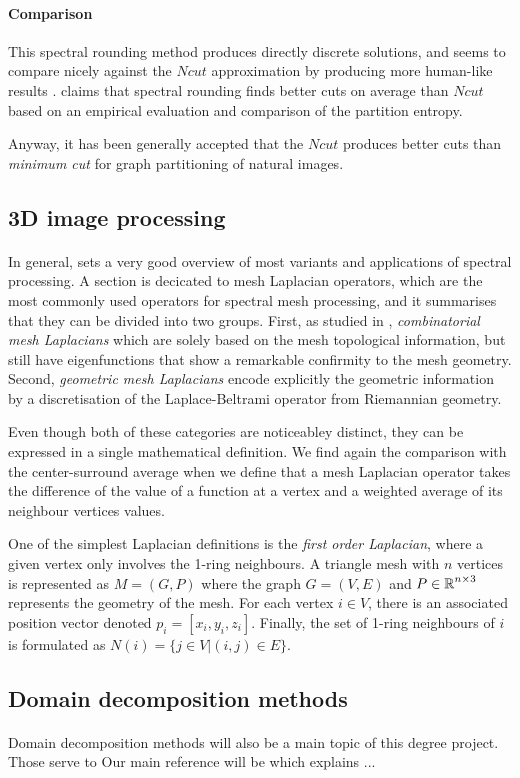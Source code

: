 \paragraph{Comparison}
This spectral rounding method produces directly discrete solutions, and seems to compare nicely against the \(Ncut\) approximation by producing more human-like results \cite{tolliver_spectral_2006}.
\cite{tolliver_graph_2006} claims that spectral rounding finds better cuts on average than \(Ncut\) based on an empirical evaluation and comparison of the partition entropy.

Anyway, it has been generally accepted that the \(Ncut\) produces better cuts than \textit{minimum cut} for graph partitioning of natural images.

\subsection{3D image processing}

\paragraph{}
In general, \cite{zhang_spectral_2010} sets a very good overview of most variants and applications of spectral processing.
A section is decicated to mesh Laplacian operators, which are the most commonly used operators for spectral mesh processing, and it summarises that they can be divided into two groups.
First, as studied in \cite{chung_spectral_1997}, \textit{combinatorial mesh Laplacians} which are solely based on the mesh topological information, but still have eigenfunctions that show a remarkable confirmity to the mesh geometry.
Second, \textit{geometric mesh Laplacians} encode explicitly the geometric information by a discretisation of the Laplace-Beltrami operator from Riemannian geometry.

Even though both of these categories are noticeabley distinct, they can be expressed in a single mathematical definition.
We find again the comparison with the center-surround average when we define that a mesh Laplacian operator takes the difference of the value of a function at a vertex and a weighted average of its neighbour vertices values.

One of the simplest Laplacian definitions is the \textit{first order Laplacian}, where a given vertex only involves the 1-ring neighbours.
A triangle mesh with \(n\) vertices is represented as \(M = (G, P)\) where the graph \(G = (V, E)\) and \(P \in \operatorname{\mathbb{R}}^{n\times 3}\) represents the geometry of the mesh.
For each vertex \(i \in V\), there is an associated position vector denoted \(p_i = [x_i, y_i, z_i]\).
Finally, the set of 1-ring neighbours of \(i\) is formulated as \(N(i) = \{j \in V | (i, j) \in E\}\).


\subsection{Domain decomposition methods}

\paragraph{}
Domain decomposition methods will also be a main topic of this degree project.
Those serve to %
Our main reference will be \cite{dolean_domain_2015} which explains ...
